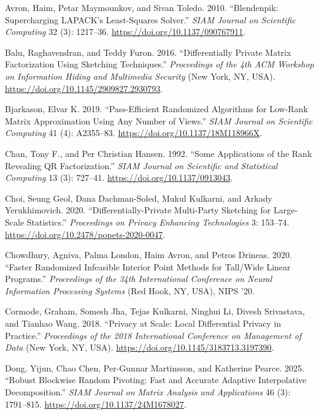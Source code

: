 \documentclass[
  12pt,
]{article}
\newlength{\cslhangindent}
\newenvironment{CSLReferences}[2] %
 {\begin{list}{}{%
  \setlength{\itemindent}{0pt}
  \setlength{\leftmargin}{0pt}
  \setlength{\parsep}{0pt}
  \ifodd #1
   \setlength{\leftmargin}{\cslhangindent}
   \setlength{\itemindent}{-1\cslhangindent}
  \fi
  \setlength{\itemsep}{#2\baselineskip}}}
 {\end{list}}
\begin{document}
\protect{}\label{refs}
\begin{CSLReferences}{1}{1}
Avron, Haim, Petar Maymounkov, and Sivan Toledo. 2010. {``Blendenpik:
Supercharging LAPACK's Least-Squares Solver.''} \emph{SIAM Journal on
Scientific Computing} 32 (3): 1217--36.
\url{https://doi.org/10.1137/090767911}.

Balu, Raghavendran, and Teddy Furon. 2016. {``Differentially Private
Matrix Factorization Using Sketching Techniques.''} \emph{Proceedings of
the 4th ACM Workshop on Information Hiding and Multimedia Security} (New
York, NY, USA). \url{https://doi.org/10.1145/2909827.2930793}.

Bjarkason, Elvar K. 2019. {``Pass-Efficient Randomized Algorithms for
Low-Rank Matrix Approximation Using Any Number of Views.''} \emph{SIAM
Journal on Scientific Computing} 41 (4): A2355--83.
\url{https://doi.org/10.1137/18M118966X}.

Chan, Tony F., and Per Christian Hansen. 1992. {``Some Applications of
the Rank Revealing QR Factorization.''} \emph{SIAM Journal on Scientific
and Statistical Computing} 13 (3): 727--41.
\url{https://doi.org/10.1137/0913043}.

Choi, Seung Geol, Dana Dachman-Soled, Mukul Kulkarni, and Arkady
Yerukhimovich. 2020. {``Differentially-Private Multi-Party Sketching for
Large-Scale Statistics.''} \emph{Proceedings on Privacy Enhancing
Technologies} 3: 153--74.
\url{https://doi.org/10.2478/popets-2020-0047}.

Chowdhury, Agniva, Palma London, Haim Avron, and Petros Drineas. 2020.
{``Faster Randomized Infeasible Interior Point Methods for Tall/Wide
Linear Programs.''} \emph{Proceedings of the 34th International
Conference on Neural Information Processing Systems} (Red Hook, NY,
USA), NIPS '20.

Cormode, Graham, Somesh Jha, Tejas Kulkarni, Ninghui Li, Divesh
Srivastava, and Tianhao Wang. 2018. {``Privacy at Scale: Local
Differential Privacy in Practice.''} \emph{Proceedings of the 2018
International Conference on Management of Data} (New York, NY, USA).
\url{https://doi.org/10.1145/3183713.3197390}.

Dong, Yijun, Chao Chen, Per-Gunnar Martinsson, and Katherine Pearce.
2025. {``Robust Blockwise Random Pivoting: Fast and Accurate Adaptive
Interpolative Decomposition.''} \emph{SIAM Journal on Matrix Analysis
and Applications} 46 (3): 1791--815.
\url{https://doi.org/10.1137/24M1678027}.


\end{CSLReferences}
\end{document}
